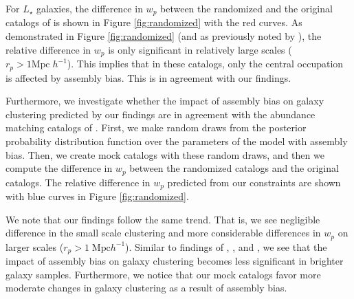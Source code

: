 \documentclass[12pt, preprint]{aastex}
\begin{document}
For $L_{\star}$ galaxies, the difference in $w_{p}$ between the randomized and the original catalogs of \citet{hw2013} is shown in Figure \ref{fig:randomized} with the red curves. As demonstrated in Figure \ref{fig:randomized} (and as previously noted by \citealt{arz2014,edHOD-weinberg}), the relative difference in $w_{p}$ is only significant in relatively large scales ($r_{p} > 1 \mathrm{Mpc} \; h^{-1}$). This implies that in these catalogs, only the central occupation is affected by assembly bias. This is in agreement with our findings. 

Furthermore, we investigate whether the impact of assembly bias on galaxy clustering predicted by our findings are in agreement with the abundance matching catalogs of \citet{hw2013}. First, we make random draws from the posterior probability distribution function over the parameters of the model with assembly bias. Then, we create mock catalogs with these random draws, and then we compute the difference in $w_{p}$ between the randomized catalogs and the original catalogs. The relative difference in $w_{p}$ predicted from our constraints are shown with blue curves in Figure \ref{fig:randomized}. 

We note that our findings follow the same trend. That is, we see negligible difference in the small scale clustering and more considerable differences in $w_{p}$ on larger scales ($r_{p} > 1\; \mathrm{Mpc}h^{-1}$). Similar to findings of \citet{arz2014}, \citet{lehman2015}, and \citet{edHOD-weinberg}, we see that the impact of assembly bias on galaxy clustering becomes less significant in brighter galaxy samples. Furthermore, we notice that our mock catalogs favor more moderate changes in galaxy clustering as a result of assembly bias. 
\end{document}
